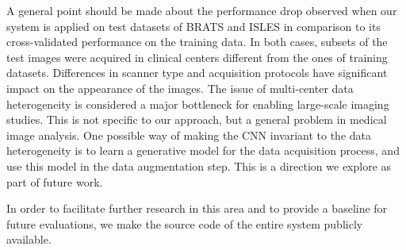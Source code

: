 A general point should be made about the performance drop observed when our system is applied on test datasets of BRATS and ISLES in comparison to its cross-validated performance on the training data. In both cases, subsets of the test images were acquired in clinical centers different from the ones of training datasets. Differences in scanner type and acquisition protocols have significant impact on the appearance of the images. The issue of multi-center data heterogeneity is considered a major bottleneck for enabling large-scale imaging studies. This is not specific to our approach, but a general problem in medical image analysis. One possible way of making the CNN invariant to the data heterogeneity is to learn a generative model for the data acquisition process, and use this model in the data augmentation step. This is a direction we explore as part of future work.

In order to facilitate further research in this area and to provide a baseline for future evaluations, we make the source code of the entire system publicly available.
